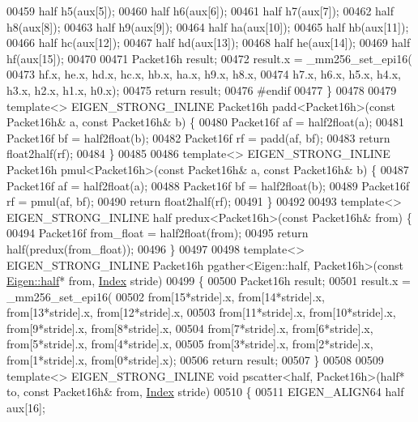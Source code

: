\begin{DoxyCode}
00459   half h5(aux[5]);
00460   half h6(aux[6]);
00461   half h7(aux[7]);
00462   half h8(aux[8]);
00463   half h9(aux[9]);
00464   half ha(aux[10]);
00465   half hb(aux[11]);
00466   half hc(aux[12]);
00467   half hd(aux[13]);
00468   half he(aux[14]);
00469   half hf(aux[15]);
00470 
00471   Packet16h result;
00472   result.x = \_mm256\_set\_epi16(
00473       hf.x, he.x, hd.x, hc.x, hb.x, ha.x, h9.x, h8.x,
00474       h7.x, h6.x, h5.x, h4.x, h3.x, h2.x, h1.x, h0.x);
00475   \textcolor{keywordflow}{return} result;
00476 \textcolor{preprocessor}{#endif}
00477 \}
00478 
00479 \textcolor{keyword}{template}<> EIGEN\_STRONG\_INLINE Packet16h padd<Packet16h>(\textcolor{keyword}{const} Packet16h& a, \textcolor{keyword}{const} Packet16h& b) \{
00480   Packet16f af = half2float(a);
00481   Packet16f bf = half2float(b);
00482   Packet16f rf = padd(af, bf);
00483   \textcolor{keywordflow}{return} float2half(rf);
00484 \}
00485 
00486 \textcolor{keyword}{template}<> EIGEN\_STRONG\_INLINE Packet16h pmul<Packet16h>(\textcolor{keyword}{const} Packet16h& a, \textcolor{keyword}{const} Packet16h& b) \{
00487   Packet16f af = half2float(a);
00488   Packet16f bf = half2float(b);
00489   Packet16f rf = pmul(af, bf);
00490   \textcolor{keywordflow}{return} float2half(rf);
00491 \}
00492 
00493 \textcolor{keyword}{template}<> EIGEN\_STRONG\_INLINE half predux<Packet16h>(\textcolor{keyword}{const} Packet16h& from) \{
00494   Packet16f from\_float = half2float(from);
00495   \textcolor{keywordflow}{return} half(predux(from\_float));
00496 \}
00497 
00498 \textcolor{keyword}{template}<> EIGEN\_STRONG\_INLINE Packet16h pgather<Eigen::half, Packet16h>(\textcolor{keyword}{const} 
      \hyperlink{struct_eigen_1_1half}{Eigen::half}* from, \hyperlink{namespace_eigen_a62e77e0933482dafde8fe197d9a2cfde}{Index} stride)
00499 \{
00500   Packet16h result;
00501   result.x = \_mm256\_set\_epi16(
00502       from[15*stride].x, from[14*stride].x, from[13*stride].x, from[12*stride].x,
00503       from[11*stride].x, from[10*stride].x, from[9*stride].x, from[8*stride].x,
00504       from[7*stride].x, from[6*stride].x, from[5*stride].x, from[4*stride].x,
00505       from[3*stride].x, from[2*stride].x, from[1*stride].x, from[0*stride].x);
00506   \textcolor{keywordflow}{return} result;
00507 \}
00508 
00509 \textcolor{keyword}{template}<> EIGEN\_STRONG\_INLINE \textcolor{keywordtype}{void} pscatter<half, Packet16h>(half* to, \textcolor{keyword}{const} Packet16h& from, 
      \hyperlink{namespace_eigen_a62e77e0933482dafde8fe197d9a2cfde}{Index} stride)
00510 \{
00511   EIGEN\_ALIGN64 half aux[16];

\end{DoxyCode}
